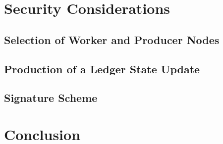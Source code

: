 \documentclass[a4paper, 12pt]{book}
\begin{document}




%



%


\chapter{Security Considerations} \label{Cha:Sec}




\section{Selection of Worker and Producer Nodes}\label{Sec:ConSec}



\section{Production of a Ledger State Update}\label{Sec:SecLsu}




\section{Signature Scheme}\label{Sec:SSS}





\chapter*{Conclusion} \label{Cha:Con}




\begin{raggedright}
\normalem
\printbibliography

\end{raggedright}
\end{document}
